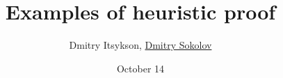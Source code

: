 

\title[\insertframenumber/\inserttotalframenumber~|~
Examples of heuristic proofs]{Examples of heuristic proof}
\author[Sokolov D.O]{Dmitry Itsykson, \underline{Dmitry Sokolov}}

\date{October 14}



	\maketitle

	



